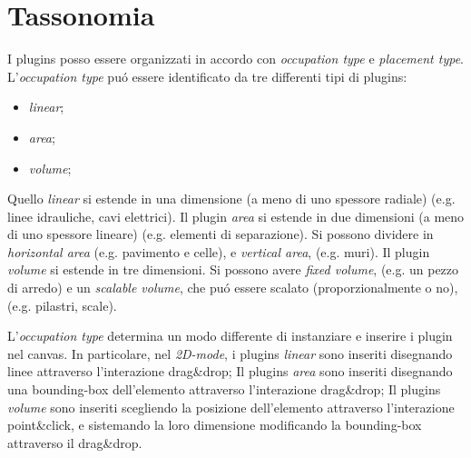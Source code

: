 \section{Tassonomia}
\label{sec:chapter_3_section_2}

\noindent
I plugins posso essere organizzati in accordo con \emph{occupation type} e \emph{placement type}.
L'\emph{occupation type} pu\'o essere identificato da tre differenti tipi di plugins:
\begin{itemize}
  \item \emph{linear};
  \item \emph{area};
  \item \emph{volume};
\end{itemize}
Quello \emph{linear} si estende in una dimensione (a meno di uno spessore radiale) (e.g. linee idrauliche, cavi elettrici).
Il plugin \emph{area} si estende in due dimensioni (a meno di uno spessore lineare) (e.g. elementi di separazione).
Si possono dividere in \emph{horizontal area} (e.g. pavimento e celle), e \emph{vertical area}, (e.g. muri).
Il plugin \emph{volume} si estende in tre dimensioni. Si possono avere \emph{fixed volume}, (e.g. un pezzo di arredo) e
un \emph{scalable volume}, che pu\'o essere scalato (proporzionalmente o no), (e.g. pilastri, scale).


L'\emph{occupation type} determina un modo differente di instanziare e inserire i plugin nel canvas.
In particolare, nel \emph{2D-mode}, i plugins \emph{linear} sono inseriti disegnando linee attraverso l'interazione drag\&drop;
Il plugins \emph{area} sono inseriti disegnando una bounding-box dell'elemento attraverso l'interazione drag\&drop;
Il plugins \emph{volume} sono inseriti scegliendo la posizione dell'elemento attraverso l'interazione point\&click,
e sistemando la loro dimensione modificando la bounding-box attraverso il drag\&drop.

